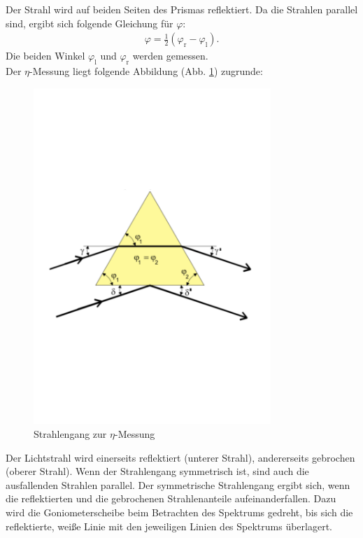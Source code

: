 Der Strahl wird auf beiden Seiten des Prismas reflektiert.
Da die Strahlen parallel sind, ergibt sich folgende Gleichung für $\varphi$:
\begin{align}
  \varphi= \frac{1}{2} (\varphi_{\text{r}} - \varphi_{\text{l}}).
\end{align}
Die beiden Winkel $\varphi_{\text{l}}$ und $\varphi_{\text{r}}$ werden gemessen.
\\Der $\eta$-Messung liegt folgende Abbildung (Abb. \ref{fig:etamessung1}) zugrunde:
\begin{figure}[h!]
  \centering
  \includegraphics[width=0.8\textwidth]{etamessung1.pdf}
  \caption{Strahlengang zur $\eta$-Messung \cite{1}}
  \label{fig:etamessung1}
\end{figure}
Der Lichtstrahl wird einerseits reflektiert (unterer Strahl), andererseits gebrochen (oberer Strahl).
Wenn der Strahlengang symmetrisch ist, sind auch die ausfallenden Strahlen parallel.
Der symmetrische Strahlengang ergibt sich, wenn die reflektierten und die gebrochenen Strahlenanteile aufeinanderfallen.
Dazu wird die Goniometerscheibe beim Betrachten des Spektrums gedreht, bis sich die reflektierte, weiße Linie mit den jeweiligen Linien des Spektrums überlagert.
